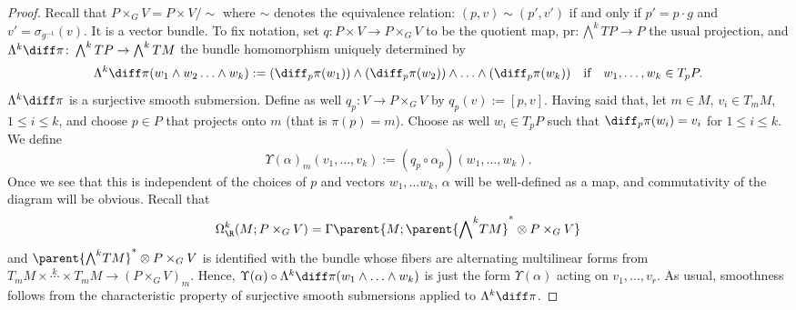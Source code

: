 \begin{proof}
    Recall that \(P\times_G V=P \times V/\sim\) where \(\sim\) denotes the equivalence relation: \((p, v) \sim (p', v')\) if and only if \(p'=p\cdot g\) and \(v'=\sigma_{g^{-1}}(v)\). It is a vector bundle. To fix notation, set \(q\colon P \times V \to P \times_G V\) to be the quotient map, \(\mathrm{pr}\colon \bigwedge^k TP \to P\) the usual projection, and \(\Lambda^k\diff\pi \colon \bigwedge^k TP \to \bigwedge^k TM\) the bundle homomorphism uniquely determined by 
    \[
    \Lambda^k \diff \pi (w_1 \wedge w_2 \ldots \wedge w_k):=(\diff_p\pi(w_1))\wedge (\diff_p \pi(w_2))\wedge \ldots \wedge (\diff_p\pi(w_k)) \ \ \ \text{if} \ \ \ w_1, \ldots, w_k \in T_pP.
    \]
    \(\Lambda^k \diff \pi\) is a surjective smooth submersion. Define as well \(q_p\colon V \to P\times_G V\) by \(q_p(v):=[p,v]\). Having said that, let \(m \in M\), \(v_i \in T_mM\), \(1 \leq i \leq k\), and choose \(p \in P\) that projects onto \(m\) (that is \(\pi(p)=m\)). Choose as well \(w_i \in T_pP\) such that \(\diff_p\pi(w_i)=v_i\) for \(1 \leq i \leq k\). We define
    \begin{equation} \label{eq_def_alpha}
    \Upsilon(\alpha)_m(v_1, \ldots, v_k):=(q_p \circ \alpha_p)(w_1, \ldots, w_k).
    \end{equation}
    Once we see that this is independent of the choices of \(p\) and vectors \(w_1, \ldots w_k\), \(\alpha\) will be well-defined as a map, and commutativity of the diagram will be obvious. Recall that
    \[
    \Omega^k_\R(M;P \times_G V)=\Gamma \parent{M; \parent{{\bigwedge}^kTM}^* \otimes P \times_G V}
    \]
    and \(\parent{{\bigwedge}^kTM}^* \otimes P \times_G V\) is identified with the bundle whose fibers are alternating multilinear forms from \(T_mM\times \overset{k}{\cdots} \times T_mM \to (P \times_G V)_m\). Hence, \(\Upsilon(\alpha) \circ \Lambda^k \diff \pi(w_1 \wedge \ldots \wedge w_k)\) is just the form \(\Upsilon(\alpha)\) acting on \(v_1, \ldots, v_r\). As usual, smoothness follows from the characteristic property of surjective smooth submersions \parencite[Th. 4.29]{lee_introSM} applied to \(\Lambda^k \diff\pi\).  


\end{proof}
